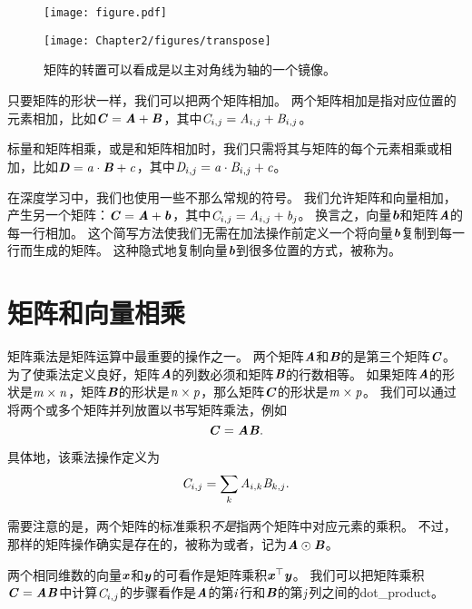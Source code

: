 \begin{figure}[!hbt]
\ifOpenSource
\centerline{\texttt{[image: figure.pdf]}}
\else
\centerline{\texttt{[image: Chapter2/figures/transpose]}}
\fi
\caption{矩阵的转置可以看成是以主对角线为轴的一个镜像。}
\label{fig:chap2_transpose}
\end{figure}


只要矩阵的形状一样，我们可以把两个矩阵相加。
两个矩阵相加是指对应位置的元素相加，比如$\MC=\MA+\MB$，其中$\SC_{i,j}= \SA_{i,j}+\SB_{i,j}$。


标量和矩阵相乘，或是和矩阵相加时，我们只需将其与矩阵的每个元素相乘或相加，比如$\MD = \Sa \cdot \MB + \Sc$，其中$\SD_{i,j} = \Sa\cdot  \SB_{i,j} + \Sc$。


在深度学习中，我们也使用一些不那么常规的符号。
我们允许矩阵和向量相加，产生另一个矩阵：$\MC=\MA + \Vb$，其中$\SC_{i,j}= \SA_{i,j} + \Sb_{j}$。
换言之，向量$\Vb$和矩阵$\MA$的每一行相加。
这个简写方法使我们无需在加法操作前定义一个将向量$\Vb$复制到每一行而生成的矩阵。
这种隐式地复制向量$\Vb$到很多位置的方式，被称为。




\section{矩阵和向量相乘}
\label{sec:multiplying_matrices_and_vectors}

矩阵乘法是矩阵运算中最重要的操作之一。
两个矩阵$\MA$和$\MB$的是第三个矩阵$\MC$。
为了使乘法定义良好，矩阵$\MA$的列数必须和矩阵$\MB$的行数相等。
如果矩阵$\MA$的形状是$\Sm \times \Sn$，矩阵$\MB$的形状是$\Sn\times \Sp$，那么矩阵$\MC$的形状是$\Sm\times \Sp$。
我们可以通过将两个或多个矩阵并列放置以书写矩阵乘法，例如
\begin{equation}
    \MC=\MA\MB.
\end{equation}


具体地，该乘法操作定义为
\begin{equation}
    \SC_{i,j}=\sum_k \SA_{i,k} \SB_{k,j}.
\end{equation}


需要注意的是，两个矩阵的标准乘积\emph{不是}指两个矩阵中对应元素的乘积。
不过，那样的矩阵操作确实是存在的，被称为或者，记为$\MA\odot\MB$。


两个相同维数的向量$\Vx$和$\Vy$的可看作是矩阵乘积$\Vx^\top\Vy$。
我们可以把矩阵乘积$\MC=\MA\MB$中计算$\SC_{i,j}$的步骤看作是$\MA$的第$\Si$行和$\MB$的第$\Sj$列之间的\gls{dot_product}。


